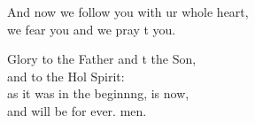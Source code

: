 \begin{psalmverse}
\begin{patverse}
And now we follow you with ur whole heart,\Med\\
we fear you and we pray t you.

Glory to the Father and t the Son,\Med\\
    and to the Hol Spirit:\\
as it was in the beginn\pointup{\i}ng, is now,\Med\\
    and will be for ever. men.
  \end{patverse}
\end{psalmverse}
